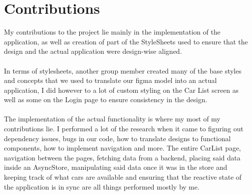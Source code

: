 \section{Contributions}
My contributions to the project lie mainly in the implementation of the application, as well as creation of part of the StyleSheets used to ensure that the design and the actual application were design-wise aligned.
\\\\
In terms of stylesheets, another group member created many of the base styles and concepts that we used to translate our figma model into an actual application, I did however to a lot of custom styling on the Car List screen as well as some on the Login page to ensure consistency in the design.
\\\\
The implementation of the actual functionality is where my most of my contributions lie. I performed a lot of the research when it came to figuring out dependency issues, bugs in our code, how to translate designs to functional components, how to implement navigation and more. The entire CarList page, navigation between the pages, fetching data from a backend, placing said data inside an AsyncStore, manipulating said data once it was in the store and keeping track of what cars are available and ensuring that the reactive state of the application is in sync are all things performed mostly by me.
